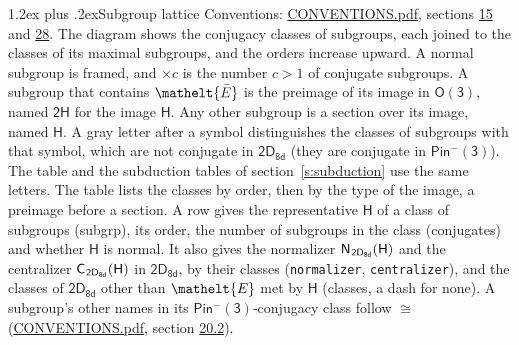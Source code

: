 \documentclass[10pt,a4paper]{article}
\makeatletter
\renewcommand\section{\@startsection{section}{1}{\z@}{-3ex plus -1ex minus -.2ex}%
  {1.2ex plus .2ex}{\normalfont\large\sffamily\bfseries\color{parttitle}}}
\numberwithin{equation}{section}
\newcommand{\eltfont}[1]{{\let\sigma\eltsigma\mathelt{#1}}}
\newcommand{\grp}[1]{\mathsf{#1}}
\newcommand{\cls}[1]{\eltfont{#1}}
\newcommand{\elt}[1]{\eltfont{#1}}
\newcommand{\samecls}{\cong}
\newcommand{\barred}[1]{\bar{#1}}
\newcommand{\hairsp}{\mkern1mu}
\makeatother
\begin{document}
\section{Subgroup lattice}\label{s:subgroups}
Conventions: \href{../../CONVENTIONS.pdf}{CONVENTIONS.pdf}, sections \href{../../../rotation/CONVENTIONS.pdf\#conv.15}{15} and \href{../../CONVENTIONS.pdf\#conv.28}{28}.
The diagram shows the conjugacy classes of subgroups, each joined to the classes of its maximal subgroups, and the orders increase upward. \label{n:index.conjugates.c}\label{n:mark.conjugates}A normal subgroup is framed, and ${\times}c$ is the number $c > 1$ of conjugate subgroups. \label{n:group.H}A subgroup that contains $\elt{\barred{E}}$ is the preimage of its image in $\grp{O(3)}$, named $\grp{2H}$ for the image $\grp{H}$. Any other subgroup is a section over its image, named $\grp{H}$. \label{n:mark.letter}A gray letter after a symbol distinguishes the classes of subgroups with that symbol, which are not conjugate in $\grp{2D_{8d}}$ (they are conjugate in \href{Pinminus3.pdf}{$\grp{Pin^{-}(3)}$}). The table and the subduction tables of section~\ref{s:subduction} use the same letters. The table lists the classes by order, then by the type of the image, a preimage before a section. \label{n:head.subgroup}\label{n:head.order}\label{n:head.conjugates}\label{n:head.normal}A row gives the representative $\grp{H}$ of a class of subgroups (subgrp), its order, the number of subgroups in the class (conjugates) and whether $\grp{H}$ is normal. \label{n:group.normalizer}\label{n:group.centralizer}\label{n:head.classes}It also gives the normalizer $\grp{N}_{\hairsp \grp{2D_{8d}}}(\grp{H})$ and the centralizer $\grp{C}_{\hairsp \grp{2D_{8d}}}(\grp{H})$ in $\grp{2D_{8d}}$, by their classes (\texttt{normalizer}, \texttt{centralizer}), and the classes of $\grp{2D_{8d}}$ other than $\cls{E}$ met by $\grp{H}$ (classes, a dash for none). A subgroup's other names in its \href{Pinminus3.pdf}{$\grp{Pin^{-}(3)}$}-conjugacy class follow $\samecls$ (\href{../../CONVENTIONS.pdf}{CONVENTIONS.pdf}, section \href{../../CONVENTIONS.pdf\#conv.20.2}{20.2}).
\end{document}
